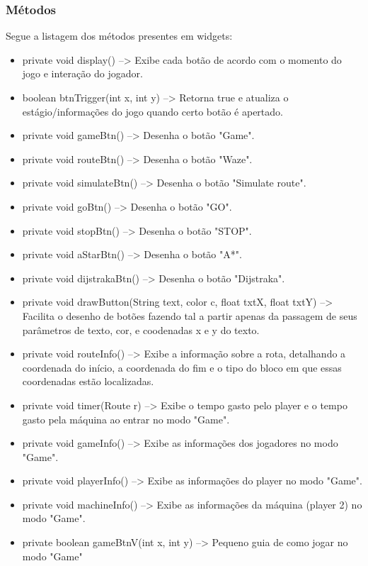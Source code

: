 \documentclass[
	12pt,				%
	oneside,			%
	a4paper,			%
	english,			%
	brazil,				%
	]{abntex2}
\begin{document}
{\subsubsection{Métodos}

Segue a listagem dos métodos presentes em widgets:

\begin{itemize}
    \item private void display() --> Exibe cada botão de acordo com o momento do jogo e interação do jogador.
    \item boolean btnTrigger(int x, int y) --> Retorna true e atualiza o estágio/informações do jogo quando certo botão é apertado.
    \item private void gameBtn() --> Desenha o botão "Game".
    \item private void routeBtn() --> Desenha o botão "Waze".
    \item private void simulateBtn() --> Desenha o botão "Simulate route".
    \item private void goBtn() --> Desenha o botão "GO".
    \item private void stopBtn() --> Desenha o botão "STOP".
    \item private void aStarBtn() --> Desenha o botão "A*".
    \item private void dijstrakaBtn() --> Desenha o botão "Dijstraka".
    \item private void drawButton(String text, color c, float txtX, float txtY) --> Facilita o desenho de botões fazendo tal a partir apenas da passagem de seus parâmetros de texto, cor, e coodenadas x e y do texto.
    \item private void routeInfo() --> Exibe a informação sobre a rota, detalhando a coordenada do início, a coordenada do fim e o tipo do bloco em que essas coordenadas estão localizadas.
    \item private void timer(Route r) --> Exibe o tempo gasto pelo player e o tempo gasto pela máquina ao entrar no modo "Game".
    \item private void gameInfo() --> Exibe as informações dos jogadores no modo "Game".
    \item private void playerInfo() --> Exibe as informações do player no modo "Game".
    \item private void machineInfo() --> Exibe as informações da máquina (player 2) no modo "Game".
    \item private boolean gameBtnV(int x, int y) --> Pequeno guia de como jogar no modo "Game"

\end{itemize}}
\end{document}
